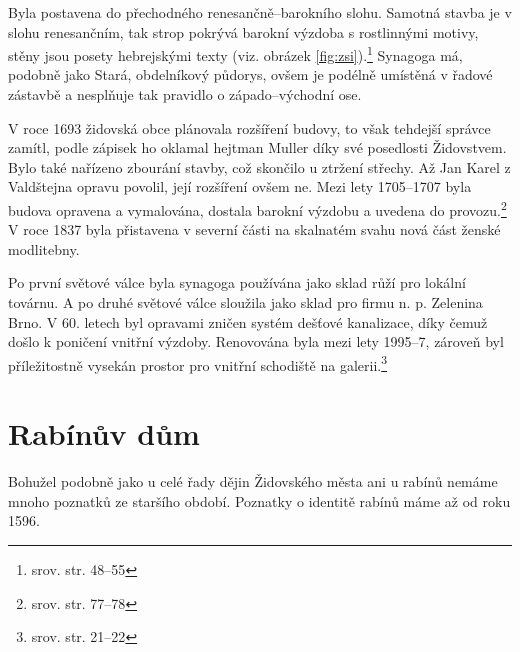 \documentclass[a4paper,oneside,12pt]{report}
\begin{document}
Byla postavena do přechodného renesančně--barokního slohu.
Samotná stavba je v slohu renesančním, tak strop pokrývá barokní výzdoba s rostlinnými motivy, stěny jsou posety hebrejskými texty (viz. obrázek \ref{fig:zsi}).\footnote{srov. \cite{Klenovsky2003} str. 48--55}
Synagoga má, podobně jako Stará, obdelníkový půdorys, ovšem je podélně umístěná v řadové zástavbě a nesplňuje tak pravidlo o západo--východní ose.

V roce 1693 židovská obce plánovala rozšíření budovy, to však tehdejší správce zamítl, podle zápisek ho oklamal hejtman Muller díky své posedlosti Židovstvem.
Bylo také nařízeno zbourání stavby, což skončilo u ztržení střechy.
Až Jan Karel z Valdštejna opravu povolil, její rozšíření ovšem ne.
Mezi lety 1705--1707 byla budova opravena a vymalována, dostala barokní výzdobu a uvedena do provozu.\footnote{srov. \cite{Fiser2005} str. 77--78}
V roce 1837 byla přistavena v severní části na skalnatém svahu nová část ženské modlitebny.

Po první světové válce byla synagoga používána jako sklad růží pro lokální továrnu.
A po druhé světové válce sloužila jako sklad pro firmu n. p. Zelenina Brno.
V 60. letech byl opravami zničen systém dešťové kanalizace, díky čemuž došlo k poničení vnitřní výzdoby.
Renovována byla mezi lety 1995--7, zároveň byl příležitostně vysekán prostor pro vnitřní schodiště na galerii.\footnote{srov. \cite{Hanackova2008} str. 21--22}

\section{Rabínův dům}

Bohužel podobně jako u celé řady dějin Židovského města ani u rabínů nemáme mnoho poznatků ze staršího období.
Poznatky o identitě rabínů máme až od roku 1596.
\end{document}
